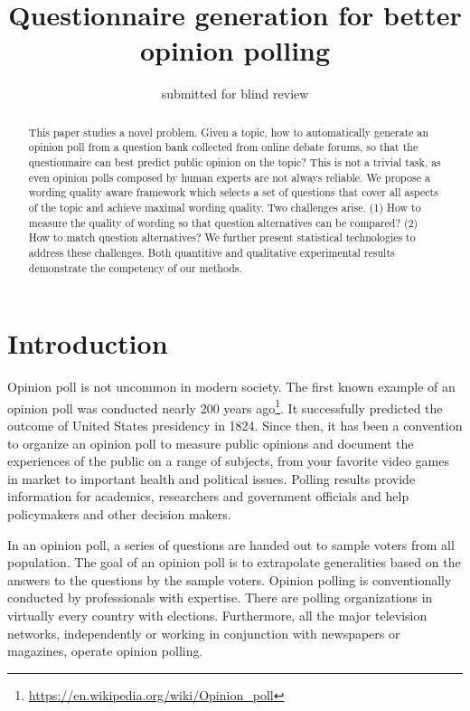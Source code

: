 \documentclass{llncs}
\begin{document}
\title{Questionnaire generation for better opinion polling}
\author{submitted for blind review}
\maketitle




\begin{abstract}
This paper studies a novel problem. Given a topic, how to automatically generate an opinion poll from a question bank collected from online debate forums, so that the questionnaire can best predict public opinion on the topic?  This is not a trivial task, as even opinion polls composed by human experts are not always reliable. We propose a wording quality aware framework which selects a set of questions that cover all aspects of the topic and achieve maximal wording quality. Two challenges arise. (1) How to measure the quality of wording so that question alternatives can be compared? (2) How to match question alternatives?  We further present statistical technologies to address these challenges. Both quantitive and qualitative experimental results demonstrate the competency of our methods.


\end{abstract}




\section{Introduction}


Opinion poll is not uncommon in modern society. The first known example of an opinion poll was conducted nearly 200 years ago\footnote{\url{https://en.wikipedia.org/wiki/Opinion_poll}}. It successfully predicted the outcome of United States presidency in 1824. Since then, it has been a convention to organize an opinion poll to measure public opinions and document the experiences of the public on a range of subjects, from your favorite video games in market to important health and political issues. Polling results provide information for academics, researchers and government officials and help policymakers and other decision makers.


In an opinion poll, a series of questions are handed out to sample voters from all population. The goal of an opinion poll is to extrapolate generalities based on the answers to the questions by the sample voters.  Opinion polling is conventionally conducted by professionals with expertise. There are polling organizations in virtually every country with elections. Furthermore, all the major television networks, independently or working in conjunction with newspapers or magazines, operate opinion polling. 
\end{document}
